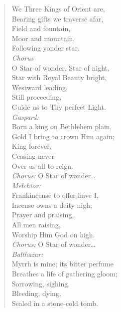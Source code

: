 
\begin{verse}
We Three Kings of Orient are,\\
Bearing gifts we traverse afar,\\
\hspace*{2em}Field and fountain,\\
\hspace*{2em}Moor and mountain,\\
Following yonder star.\\[0.7em]

\textit{Chorus}\\
O Star of wonder, Star of night,\\
Star with Royal Beauty bright,\\
\hspace*{2em}Westward leading,\\
\hspace*{2em}Still proceeding,\\
Guide us to Thy perfect Light.\\[0.7em]

\textit{Gaspard:}\\
Born a king on Bethlehem plain,\\
Gold I bring to crown Him again;\\
\hspace*{2em}King forever,\\
\hspace*{2em}Ceasing never\\
Over us all to reign.\\[0.7em]

\textit{Chorus:} O Star of wonder\ldots\\[0.7em]

\textit{Melchior:}\\
Frankincense to offer have I,\\
Incense owns a deity nigh;\\
\hspace*{2em}Prayer and praising,\\
\hspace*{2em}All men raising,\\
Worship Him God on high.\\[0.7em]

\textit{Chorus:} O Star of wonder\ldots\\[0.7em]

\textit{Balthazar:}\\
Myrrh is mine; its bitter perfume\\
Breathes a life of gathering gloom;\\
\hspace*{2em}Sorrowing, sighing,\\
\hspace*{2em}Bleeding, dying,\\
Sealed in a stone-cold tomb.\\[0.7em]


\end{verse}
